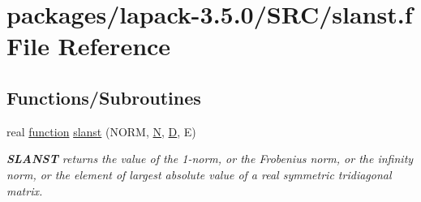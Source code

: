 \hypertarget{slanst_8f}{}\section{packages/lapack-\/3.5.0/\+S\+R\+C/slanst.f File Reference}
\label{slanst_8f}
\subsection*{Functions/\+Subroutines}
\begin{DoxyCompactItemize}
\item 
real \hyperlink{afunc_8m_a7b5e596df91eadea6c537c0825e894a7}{function} \hyperlink{group__auxOTHERauxiliary_ga3f856bc9099be84550d6c98ed9a3c810}{slanst} (N\+O\+R\+M, \hyperlink{polmisc_8c_a0240ac851181b84ac374872dc5434ee4}{N}, \hyperlink{odrpack_8h_a7dae6ea403d00f3687f24a874e67d139}{D}, E)
\begin{DoxyCompactList}\small\item\em {\bfseries S\+L\+A\+N\+S\+T} returns the value of the 1-\/norm, or the Frobenius norm, or the infinity norm, or the element of largest absolute value of a real symmetric tridiagonal matrix. \end{DoxyCompactList}\end{DoxyCompactItemize}
